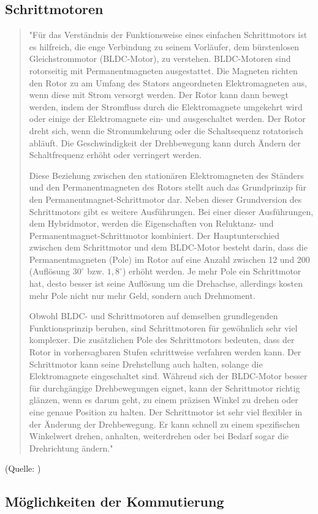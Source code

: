 \subsection{Schrittmotoren}

\begin{quote}
"Für das Verständnis der Funktionsweise eines einfachen Schrittmotors ist es hilfreich, die enge Verbindung zu seinem Vorläufer, dem bürstenlosen Gleichstrommotor (BLDC-Motor), zu verstehen. BLDC-Motoren sind rotorseitig mit Permanentmagneten ausgestattet. Die Magneten richten den Rotor zu am Umfang des Stators angeordneten Elektromagneten aus, wenn diese mit Strom versorgt werden. Der Rotor kann dann bewegt werden, indem der Stromfluss durch die Elektromagnete umgekehrt wird oder einige der Elektromagnete ein- und ausgeschaltet werden. Der Rotor dreht sich, wenn die Stromumkehrung oder die Schaltsequenz rotatorisch abläuft. Die Geschwindigkeit der Drehbewegung kann durch Ändern der Schaltfrequenz erhöht oder verringert werden.

Diese Beziehung zwischen den stationären Elektromagneten des Ständers und den Permanentmagneten des Rotors stellt auch das Grundprinzip für den Permanentmagnet-Schrittmotor dar. Neben dieser Grundversion des Schrittmotors gibt es weitere Ausführungen. Bei einer dieser Ausführungen, dem Hybridmotor, werden die Eigenschaften von Reluktanz- und Permanentmagnet-Schrittmotor kombiniert. Der Hauptunterschied zwischen dem Schrittmotor und dem BLDC-Motor besteht darin, dass die Permanentmagneten (Pole) im Rotor auf eine Anzahl zwischen 12 und 200 (Auflösung $30^\circ$ bzw. $1,8^\circ$) erhöht werden. Je mehr Pole ein Schrittmotor hat, desto besser ist seine Auflösung um die Drehachse, allerdings kosten mehr Pole nicht nur mehr Geld, sondern auch Drehmoment.

Obwohl BLDC- und Schrittmotoren auf demselben grundlegenden Funktionsprinzip beruhen, sind Schrittmotoren für gewöhnlich sehr viel komplexer. Die zusätzlichen Pole des Schrittmotors bedeuten, dass der Rotor in vorhersagbaren Stufen schrittweise verfahren werden kann. Der Schrittmotor kann seine Drehstellung auch halten, solange die Elektromagnete eingeschaltet sind. Während sich der BLDC-Motor besser für durchgängige Drehbewegungen eignet, kann der Schrittmotor richtig glänzen, wenn es darum geht, zu einem präzisen Winkel zu drehen oder eine genaue Position zu halten. Der Schrittmotor ist sehr viel flexibler in der Änderung der Drehbewegung. Er kann schnell zu einem spezifischen Winkelwert drehen, anhalten, weiterdrehen oder bei Bedarf sogar die Drehrichtung ändern."
\end{quote}
(Quelle: \cite{BLDCNanotec})


\subsection{Möglichkeiten der Kommutierung}
